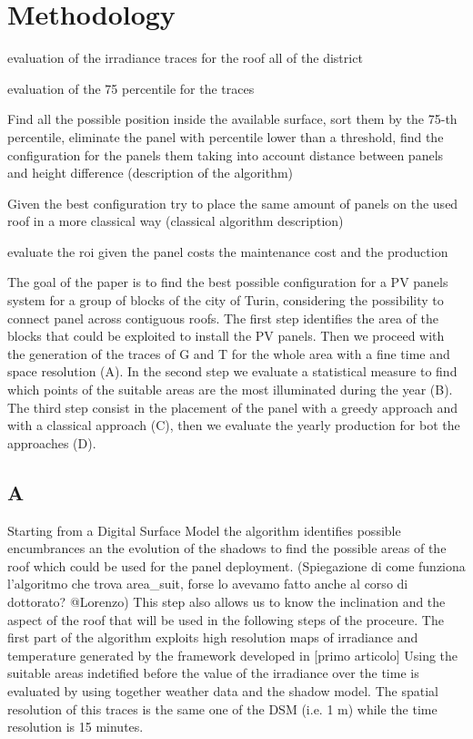 \section{Methodology}
\label{sec:method}
evaluation of the irradiance traces for the roof all of the district

evaluation of the 75 percentile for the traces


Find all the possible position inside the available surface, sort them by the 75-th percentile, eliminate the panel with percentile lower than a threshold, find the configuration for the panels them taking into account distance between panels and height difference (description of the algorithm)

Given the best configuration try to place the same amount of panels on the used roof in a more classical way (classical algorithm description)

evaluate the roi given the panel costs the maintenance cost and the production

\hline
The goal of the paper is to find the best possible configuration for a PV panels system for a group of blocks of the city of Turin, considering the possibility to connect panel across contiguous roofs. The first step identifies the area of the blocks that could be exploited to install the PV panels. Then we proceed with the generation of the traces of G and T for the whole area with a fine time and space resolution (A). In the second step we evaluate a statistical measure to find which points of the suitable areas are the most illuminated during the year (B). The third step consist in the placement of the panel with a greedy approach and with a classical approach (C), then we evaluate the yearly production for bot the approaches (D).

\subsection{A}
Starting from a Digital Surface Model the algorithm identifies possible encumbrances an the evolution of the shadows to find the possible areas of the roof which could be used for the panel deployment. (Spiegazione di come funziona l'algoritmo che trova area_suit, forse lo avevamo fatto anche al corso di dottorato? @Lorenzo)
This step also allows us to know the inclination and the aspect of the roof that will be used in the following steps of the proceure.
The first part of the algorithm exploits high resolution maps of irradiance and temperature generated by the framework developed in [primo articolo]
Using the suitable areas indetified before the value of the irradiance over the time is evaluated by using together weather data and the shadow model. The spatial resolution of this traces is the same one of the DSM (i.e. 1 m) while the time resolution is 15 minutes. 

